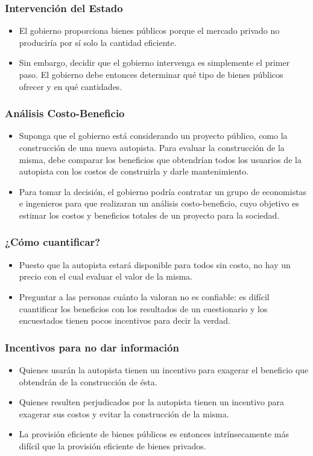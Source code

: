 \documentclass{beamer}
\begin{document}
\begin{frame}
\frametitle{Intervención del Estado}
\begin{itemize}
\item El gobierno proporciona bienes públicos porque el mercado privado no produciría por sí solo la cantidad eficiente.
\item Sin embargo, decidir que el gobierno intervenga es simplemente el primer paso. El gobierno debe entonces determinar qué tipo de bienes públicos ofrecer y en qué cantidades.
\end{itemize}
\end{frame}

\begin{frame}
\frametitle{Análisis Costo-Beneficio}
\begin{itemize}
\item Suponga que el gobierno está considerando un proyecto público, como la construcción de una nueva autopista. Para evaluar la construcción de la misma, debe comparar los beneficios que obtendrían todos los usuarios de la autopista con los costos de construirla y darle mantenimiento. 
\item Para tomar la decisión, el gobierno podría contratar un grupo de economistas e ingenieros para que realizaran un análisis costo-beneficio, cuyo objetivo es estimar los costos y beneficios totales de un proyecto para la sociedad.
\end{itemize}
\end{frame}

\begin{frame}
\frametitle{¿Cómo cuantificar?}
\begin{itemize}
\item Puesto que la autopista estará disponible para todos sin costo, no hay un precio con el cual evaluar el valor de la misma. 
\item Preguntar a las personas cuánto la valoran no es confiable: es difícil cuantificar los beneficios con los resultados de un cuestionario y los encuestados tienen
pocos incentivos para decir la verdad.
\end{itemize}
\end{frame}

\begin{frame}
\frametitle{Incentivos para no dar información}
\begin{itemize}
\item Quienes usarán la autopista tienen un incentivo para exagerar el beneficio que obtendrán de la construcción de ésta.
\item Quienes resulten perjudicados por la autopista tienen un incentivo para exagerar sus costos y evitar la construcción de la misma.
\item La provisión eficiente de bienes públicos es entonces intrínsecamente más difícil que la provisión eficiente de bienes privados. 
\end{itemize}
\end{frame}
\end{document}
